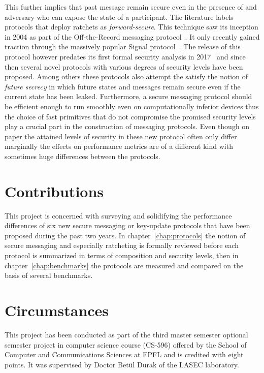 \documentclass[11pt,a4paper,twoside,openright,bibliography=totoc]{scrbook}
\begin{document}
This further implies that
past message remain secure even in the presence of and adversary who
can expose the state of a participant. The literature labels protocols
that deploy ratchets as \textit{forward-secure}. This technique saw
its inception in 2004 as part of the Off-the-Record messaging
protocol~\cite{borisov2004off}. It only recently gained traction
through the massively popular Signal protocol~\cite{perrin2016double}.
The release of this protocol however predates its first formal
security analysis in 2017~\cite{cohn2017formal}
and since then several novel protocols with various degrees of
security levels have been proposed. Among others
these protocols also attempt the satisfy the notion of \textit{future
secrecy} in which future states and messages remain secure even if the
current state has been leaked. Furthermore, a secure messaging
protocol should be efficient enough to run smoothly even on
computationally inferior devices thus the choice of fast primitives
that do not compromise the promised security levels play a crucial
part in the construction of messaging protocols. Even though on paper
the attained levels of security in these new protocol often only
differ marginally the effects on performance metrics are of a
different kind with sometimes huge differences between the protocols.


\section{Contributions}
\label{sec:contributions}

This project is concerned with surveying and solidifying the
performance differences of six new secure messaging or key-update
protocols that have been proposed during the past two years. In
chapter~\ref{chap:protocols} the notion of secure messaging and
especially ratcheting is formally reviewed before each protocol is
summarized in terms of composition and security levels, then in
chapter~\ref{chap:benchmarks} the protocols are measured and compared
on the basis of several benchmarks.

\section{Circumstances}
\label{sec:circumstances}

This project has been conducted as part of the third master semester optional
semester project in computer science course (CS-596) offered by the
School of Computer and Communications Sciences at EPFL and is credited
with eight points. It was supervised by Doctor Betül Durak of
the LASEC laboratory.
\end{document}
